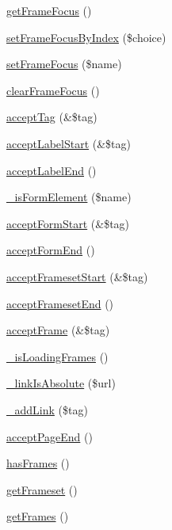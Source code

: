 \begin{DoxyCompactItemize}
\item 
\hyperlink{class_simple_page_a456eebe87832187c07378c9ecdbd6d3d}{getFrameFocus} ()
\item 
\hyperlink{class_simple_page_af37f58382ad7ba3e3278eb067e5dca7b}{setFrameFocusByIndex} (\$choice)
\item 
\hyperlink{class_simple_page_ae691ea9abe0789433934e309f77e5139}{setFrameFocus} (\$name)
\item 
\hyperlink{class_simple_page_adc6aac5383cb44f0f9ab39f17bce17d1}{clearFrameFocus} ()
\item 
\hyperlink{class_simple_page_a3ce47573a8bab24b30b3c49726dfb2d6}{acceptTag} (\&\$tag)
\item 
\hyperlink{class_simple_page_a4058acc437ebae39d3d656c42dbc8d1a}{acceptLabelStart} (\&\$tag)
\item 
\hyperlink{class_simple_page_a053ca16333751ec3d97eac827b90feb6}{acceptLabelEnd} ()
\item 
\hyperlink{class_simple_page_a6afeda6149d9f5a2016833a181205aa4}{\_\-isFormElement} (\$name)
\item 
\hyperlink{class_simple_page_aa9e3e88104c4534ef345d9277b056993}{acceptFormStart} (\&\$tag)
\item 
\hyperlink{class_simple_page_a7804f4a25baf7c9e1ea5d67f6705b9f6}{acceptFormEnd} ()
\item 
\hyperlink{class_simple_page_a6ba9a670edf6f3d4416930248da0bf2b}{acceptFramesetStart} (\&\$tag)
\item 
\hyperlink{class_simple_page_abbf865fd7f09eb6c5099ffd5e80934ca}{acceptFramesetEnd} ()
\item 
\hyperlink{class_simple_page_a153aa5e3cb38fd9e79995e8d72e1d2ea}{acceptFrame} (\&\$tag)
\item 
\hyperlink{class_simple_page_ac687a34df486e9502685c2d79cc846b4}{\_\-isLoadingFrames} ()
\item 
\hyperlink{class_simple_page_a22c888195e0976743dd43b4d98d8abbe}{\_\-linkIsAbsolute} (\$url)
\item 
\hyperlink{class_simple_page_a2897dc5949099b7051c3b16b3bd83f63}{\_\-addLink} (\$tag)
\item 
\hyperlink{class_simple_page_a03598dedc6655ed4b6ca6e91a04efab6}{acceptPageEnd} ()
\item 
\hyperlink{class_simple_page_a57d9b71b767381553cda8735fdb4c939}{hasFrames} ()
\item 
\hyperlink{class_simple_page_a2900034ec3ae1d64358c2ac81cd94d83}{getFrameset} ()
\item 
\hyperlink{class_simple_page_aaf191dd98af63ad6d6672b68e0c69bb1}{getFrames} ()

\end{DoxyCompactItemize}
